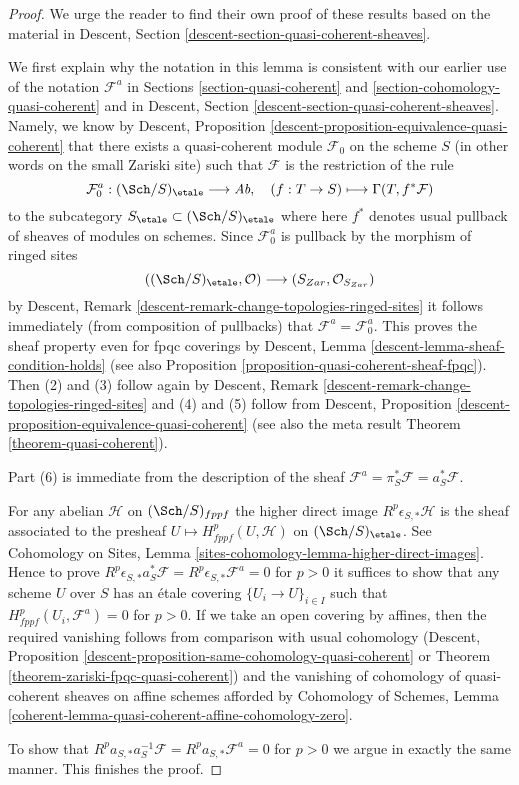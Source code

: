 \begin{proof}
We urge the reader to find their own proof of these results
based on the material in
Descent, Section \ref{descent-section-quasi-coherent-sheaves}.

\medskip\noindent
We first explain why the notation in this lemma is consistent with our
earlier use of the notation $\mathcal{F}^a$ in
Sections \ref{section-quasi-coherent} and
\ref{section-cohomology-quasi-coherent}
and in
Descent, Section \ref{descent-section-quasi-coherent-sheaves}.
Namely, we know by
Descent, Proposition \ref{descent-proposition-equivalence-quasi-coherent}
that there exists a quasi-coherent module
$\mathcal{F}_0$ on the scheme $S$ (in other words on the small
Zariski site) such that $\mathcal{F}$ is the restriction of the
rule
$$
\mathcal{F}_0^a : (\Sch/S)_\etale \longrightarrow \textit{Ab},\quad
(f : T \to S) \longmapsto \Gamma(T, f^*\mathcal{F})
$$
to the subcategory $S_\etale \subset (\Sch/S)_\etale$
where here $f^*$ denotes usual pullback of sheaves of modules on schemes.
Since $\mathcal{F}_0^a$ is pullback by the morphism of ringed
sites
$$
((\Sch/S)_\etale, \mathcal{O}) \longrightarrow (S_{Zar}, \mathcal{O}_{S_{Zar}})
$$
by Descent, Remark \ref{descent-remark-change-topologies-ringed-sites}
it follows immediately (from composition of pullbacks) that
$\mathcal{F}^a = \mathcal{F}_0^a$. This proves the sheaf property
even for fpqc coverings by
Descent, Lemma \ref{descent-lemma-sheaf-condition-holds} (see also
Proposition \ref{proposition-quasi-coherent-sheaf-fpqc}).
Then (2) and (3) follow
again by Descent, Remark \ref{descent-remark-change-topologies-ringed-sites}
and (4) and (5) follow from
Descent, Proposition \ref{descent-proposition-equivalence-quasi-coherent}
(see also the meta result
Theorem \ref{theorem-quasi-coherent}).

\medskip\noindent
Part (6) is immediate from the description of the sheaf
$\mathcal{F}^a = \pi_S^*\mathcal{F} = a_S^*\mathcal{F}$.

\medskip\noindent
For any abelian $\mathcal{H}$ on $(\Sch/S)_{fppf}$ the
higher direct image $R^p\epsilon_{S, *}\mathcal{H}$ is the sheaf
associated to the presheaf $U \mapsto H^p_{fppf}(U, \mathcal{H})$
on $(\Sch/S)_\etale$. See
Cohomology on Sites, Lemma \ref{sites-cohomology-lemma-higher-direct-images}.
Hence to prove
$R^p\epsilon_{S, *}a_S^*\mathcal{F} = R^p\epsilon_{S, *}\mathcal{F}^a = 0$
for $p > 0$ it suffices to show that any scheme $U$ over $S$
has an \'etale covering $\{U_i \to U\}_{i \in I}$ such that
$H^p_{fppf}(U_i, \mathcal{F}^a) = 0$ for $p > 0$.
If we take an open covering by affines, then the required
vanishing follows from comparison with usual cohomology
(Descent, Proposition \ref{descent-proposition-same-cohomology-quasi-coherent}
or
Theorem \ref{theorem-zariski-fpqc-quasi-coherent})
and the vanishing of cohomology of quasi-coherent sheaves
on affine schemes afforded by Cohomology of Schemes, Lemma
\ref{coherent-lemma-quasi-coherent-affine-cohomology-zero}.

\medskip\noindent
To show that $R^pa_{S, *}a_S^{-1}\mathcal{F} = R^pa_{S, *}\mathcal{F}^a = 0$
for $p > 0$ we argue in exactly the same manner. This finishes the proof.
\end{proof}

